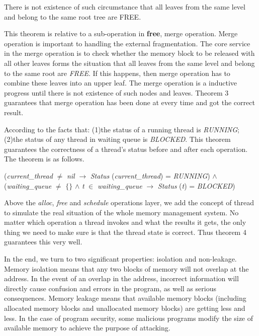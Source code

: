 \documentclass[runningheads]{llncs}
\begin{document}
\begin{theorem}
There is not existence of such circumstance that all leaves from the same level and belong to the same root tree are FREE.
\end{theorem}

This theorem is relative to a sub-operation in \textbf{free}, merge operation. Merge operation is important to handling the external fragmentation. The core service in the merge operation is to check whether the memory block to be released with all other leaves forms the situation that all leaves from the same level and belong to the same root are \textsl{FREE}. If this happens, then merge operation has to combine these leaves into an upper leaf. The merge operation is a inductive progress until there is not existence of such nodes and leaves. Theorem 3 guarantees that merge operation has been done at every time and got the correct result.

According to the facts that: (1)the status of a running thread is \textsl{RUNNING}; (2)the status of any thread in waiting queue is \textsl{BLOCKED}. This theorem guarantees the correctness of a thread's status before and after each operation. The theorem is as follows.

\begin{theorem}
(\textsl{current\_thread} $\neq$ \textsl{nil} $\longrightarrow$ \textsl{Status} (\textsl{current\_thread}) = \textsl{RUNNING}) $\wedge$ (\textsl{waiting\_queue} $\neq$ $\lbrace$$\rbrace$ $\wedge$ \textsl{t} $\in$ \textsl{waiting\_queue} $\longrightarrow$ \textsl{Status} (\textsl{t}) = \textsl{BLOCKED})
\end{theorem}

Above the \textsl{alloc}, \textsl{free} and \textsl{schedule} operations layer, we add the concept of thread to simulate the real situation of the whole memory management system. No matter which operation a thread invokes and what the results it gets, the only thing we need to make sure is that the thread state is correct. Thus theorem 4 guarantees this very well.

In the end, we turn to two significant properties: isolation and non-leakage. Memory isolation means that any two blocks of memory will not overlap at the address. In the event of an overlap in the address, incorrect information will directly cause confusion and errors in the program, as well as serious consequences. Memory leakage means that available memory blocks (including allocated memory blocks and unallocated memory blocks) are getting less and less. In the case of program security, some malicious programs modify the size of available memory to achieve the purpose of attacking.
\end{document}
